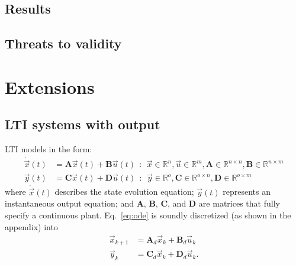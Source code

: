 \documentclass[runningheads,a4paper]{llncs}
\newcommand{\mat}[1]{\boldsymbol{#1}}
\begin{document}
\subsection{Results}


\subsection{Threats to validity}




\section{Extensions}
\label{sec:extensions}

\subsection{LTI systems with output} 
\label{ssec:LTI}

LTI models in the form: 
%
\begin{align}
\label{eq:ode}
\dot{\vec{x}}(t)&=\mat{A}\vec{x}(t)+\mat{B}\vec{u}(t)\ \ :\ \ \vec{x} \in \mathbb{R}^{n}, \vec{u} \in \mathbb{R}^m, \mat{A} \in \mathbb{R}^{n \times n},\mat{B} \in \mathbb{R}^{n \times m}\\
\vec{y}(t)&=\mat{C}\vec{x}(t)+\mat{D}\vec{u}(t)\ \ :\ \ \vec{y} \in \mathbb{R}^{o}, \mat{C} \in \mathbb{R}^{o \times n}, \mat{D}  \in \mathbb{R}^{o \times m}\nonumber
\end{align}
\noindent where $\dot{\vec{x}}(t)$ describes the state evolution equation; 
$\vec{y}(t)$ represents an instantaneous output equation; and $\mat{A}$, $\mat{B}$, $\mat{C}$, and $\mat{D}$ are matrices that fully specify 
a continuous plant. Eq.~\eqref{eq:ode} is soundly discretized 
(as shown in the appendix) into
%
\begin{align}
\label{eq:plant}
\vec{x}_{k+1}&=\mat{A}_d\vec{x}_k+\mat{B}_d\vec{u}_k\\
\vec{y}_k&=\mat{C}_d\vec{x}_k+\mat{D}_d\vec{u}_k .\nonumber
\end{align}
%
\end{document}
